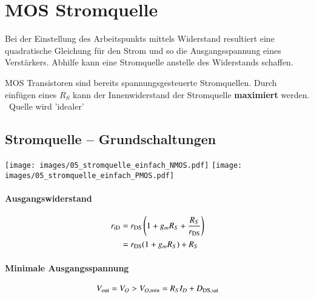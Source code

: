 \section{MOS Stromquelle}
Bei der Einstellung des Arbeitspunkts mittels Widerstand resultiert eine quadratische Gleichung für den Strom und so die Ausgangsspannung eines Verstärkers.
Abhilfe kann eine Stromquelle anstelle des Widerstands schaffen.

MOS Transistoren sind bereits spannungsgesteuerte Stromquellen.
Durch einfügen eines $R_S$ kann der Innenwiderstand der Stromquelle \textbf{maximiert} werden. \textrightarrow\ Quelle wird 'idealer'

\subsection{Stromquelle -- Grundschaltungen}


\begin{minipage}[t]{0.44\columnwidth}
    \texttt{[image: images/05\_stromquelle\_einfach\_NMOS.pdf]}
    \texttt{[image: images/05\_stromquelle\_einfach\_PMOS.pdf]}
\end{minipage}
\hfill
\begin{minipage}[t]{0.5\columnwidth}
    \paragraph{Ausgangswiderstand}

    \vspace{-0.4cm}

    \begin{align*}
         r_{\rm iD} &= r_{\rm DS} \left( 1 + g_m R_S + \frac{R_S}{r_{\rm DS}} \right) \\ 
                    &= r_{\rm DS} (1 + g_m R_S) + R_S
    \end{align*}
            

    \paragraph{Minimale Ausgangsspannung}

    \vspace{-0.2cm}

    \[
        V_{\rm out} = V_O > V_{O , \rm min} = R_S I_D + D_{\rm DS, sat}
    \]
\end{minipage}


